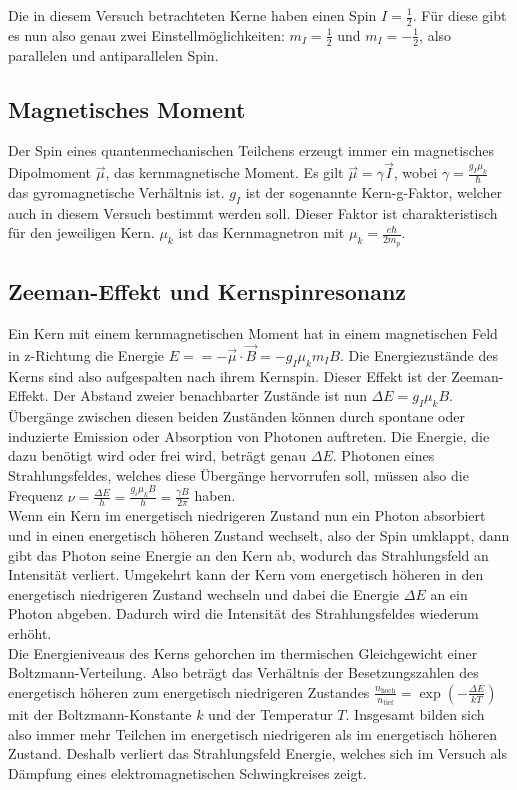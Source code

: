 \documentclass[12pt]{article}
\begin{document}
Die in diesem Versuch betrachteten Kerne haben einen Spin $I=\frac12$. Für diese gibt es nun also genau zwei Einstellmöglichkeiten: $m_I=\frac12$ und $m_I=-\frac12$, also parallelen und antiparallelen Spin.

\subsection{Magnetisches Moment}
Der Spin eines quantenmechanischen Teilchens erzeugt immer ein magnetisches Dipolmoment $\vec\mu$, das kernmagnetische Moment. Es gilt $\vec\mu=\gamma\vec I$, wobei $\gamma=\frac{g_I\mu_k}{\hbar}$ das gyromagnetische Verhältnis ist. $g_I$ ist der sogenannte Kern-g-Faktor, welcher auch in diesem Versuch bestimmt werden soll. Dieser Faktor ist charakteristisch für den jeweiligen Kern. $\mu_k$ ist das Kernmagnetron mit $\mu_k=\frac{e\hbar}{2m_p}$.

\subsection{Zeeman-Effekt und Kernspinresonanz}
Ein Kern mit einem kernmagnetischen Moment hat in einem magnetischen Feld in z-Richtung die Energie $E==-\vec\mu\cdot\vec B=-g_I\mu_km_IB$. Die Energiezustände des Kerns sind also aufgespalten nach ihrem Kernspin. Dieser Effekt ist der Zeeman-Effekt. Der Abstand zweier benachbarter Zustände ist nun $\Delta E=g_I\mu_k B$.\\

Übergänge zwischen diesen beiden Zuständen können durch spontane oder induzierte Emission oder Absorption von Photonen auftreten. Die Energie, die dazu benötigt wird oder frei wird, beträgt genau $\Delta E$. Photonen eines Strahlungsfeldes, welches diese Übergänge hervorrufen soll, müssen also die Frequenz $\nu=\frac{\Delta E}{h}=\frac{g_i\mu_kB}{h}=\frac{\gamma B}{2\pi}$ haben.\\

Wenn ein Kern im energetisch niedrigeren Zustand nun ein Photon absorbiert und in einen energetisch höheren Zustand wechselt, also der Spin umklappt, dann gibt das Photon seine Energie an den Kern ab, wodurch das Strahlungsfeld an Intensität verliert. Umgekehrt kann der Kern vom energetisch höheren in den energetisch niedrigeren Zustand wechseln und dabei die Energie $\Delta E$ an ein Photon abgeben. Dadurch wird die Intensität des Strahlungsfeldes wiederum erhöht.\\

Die Energieniveaus des Kerns gehorchen im thermischen Gleichgewicht einer Boltzmann-Verteilung. Also beträgt das Verhältnis der Besetzungszahlen des energetisch höheren zum energetisch niedrigeren Zustandes $\frac{n_{\text{hoch}}}{n_{\text{tief}}}=\exp\left(-\frac{\Delta E}{kT}\right)$ mit der Boltzmann-Konstante $k$ und der Temperatur $T$. Insgesamt bilden sich also immer mehr Teilchen im energetisch niedrigeren als im energetisch höheren Zustand. Deshalb verliert das Strahlungsfeld Energie, welches sich im Versuch als Dämpfung eines elektromagnetischen Schwingkreises zeigt.
\end{document}
